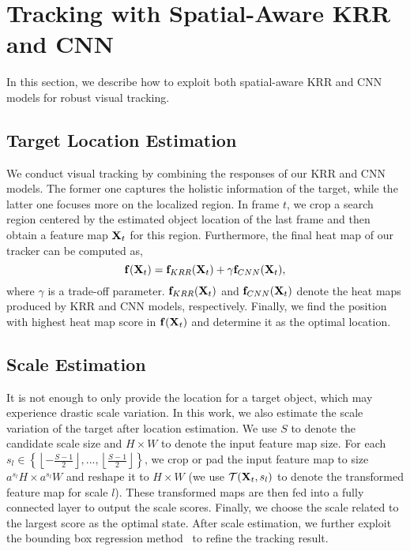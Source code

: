 \documentclass[10pt,twocolumn,letterpaper]{article}
\begin{document}
\section{Tracking with Spatial-Aware KRR and CNN}
In this section, we describe how to exploit both spatial-aware
KRR and CNN models for robust visual tracking.
\subsection{Target Location Estimation}
We conduct visual tracking by combining the responses of our KRR and CNN models. The former one
captures the holistic information of the target, while the latter one focuses more on the localized region.
In frame $t$, we crop a search region centered by the estimated object location of the last frame
and then obtain a feature map ${\bf X}_t$ for this region.
Furthermore, the final heat map of our tracker can be computed as,
\begin{equation}
{\bf f}({{\bf{X}}_t}) = {{\bf f}_{KRR}}({{\bf{X}}_t}) + \gamma{{\bf f}_{CNN}}({{\bf{X}}_t}),
\end{equation}
where $\gamma$ is a trade-off parameter. ${{\bf f}_{KRR}}({{\bf{X}}_t})$ and ${{\bf f}_{CNN}}({{\bf{X}}_t})$
denote the heat maps produced by KRR and CNN models, respectively.
Finally, we find the position with highest heat map score in ${\bf f}({{\bf{X}}_t})$ and determine it as the
optimal location.
\subsection{Scale Estimation}
It is not enough to only provide the location for a target object, which may experience drastic scale variation.
In this work, we also estimate the scale variation of the target after location estimation.
We use $S$ to denote the candidate scale size and $H\times W$ to denote the input feature map size.
For each ${s_l} \in \left\{ {\left\lfloor { - \frac{{S - 1}}{2}} \right\rfloor ,...,\left\lfloor {\frac{{S - 1}}{2}}
\right\rfloor } \right\}$, we crop or pad the input feature map to size $a^{s_l}H\times a^{s_l}W$ and reshape
it to $H\times W$ (we use ${\cal T}({\bf X}_t,s_l)$ to denote the transformed feature map for scale $l$).
These transformed maps are then fed into a fully connected layer to output the scale scores. Finally, we choose
the scale related to the largest score as the optimal state. After scale estimation, we further exploit the bounding
box regression method~\cite{girshick2014rich,nam2016learning} to refine the tracking result.
\end{document}
